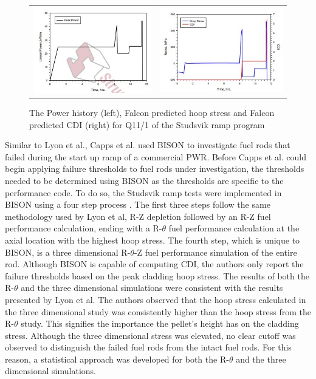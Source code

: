 \documentclass[edeposit,fullpage,11pt]{uiucthesis2009}
\begin{document}
\begin{figure}
\begin{tabular}{cc}
\includegraphics[width=0.5\linewidth]{./Figures/lyon_image_6.JPG} & \includegraphics[width=0.5\linewidth]{./Figures/lyon_image_7.JPG}
\end{tabular}
\caption{The Power history (left), Falcon predicted hoop stress and Falcon predicted CDI (right) for Q11/1 of the Studsvik ramp program \cite{lyon_pci_2009}}
\label{fig:paper_3_res}
\end{figure}


Similar to Lyon et al., Capps et al. \cite{capps_pci_2017} used BISON to investigate fuel rods that failed during the start up ramp of a commercial \gls{PWR}.
Before Capps et al. could begin applying failure thresholds to fuel rods under investigation, the thresholds needed to be determined using BISON as the thresholds are specific to the performance code.
To do so, the Studsvik ramp tests were implemented in BISON using a four step process \cite{killeen_experimental_2004}.
The first three steps follow the same methodology used by Lyon et al, R-Z depletion followed by an R-Z fuel performance calculation, ending with a R-$\theta$ fuel performance calculation at the axial location with the highest hoop stress.
The fourth step, which is unique to BISON, is a three dimensional R-$\theta$-Z fuel performance simulation of the entire rod. %
Although BISON is capable of computing \gls{CDI}, the authors only report the failure thresholds based on the peak cladding hoop stress.
The results of both the R-$\theta$ and the three dimensional simulations were consistent with the results presented by Lyon et al.
The authors observed that the hoop stress calculated in the three dimensional study was consistently higher than the hoop stress from the R-$\theta$ study.
This signifies the importance the pellet's height has on the cladding stress.
Although the three dimensional stress was elevated, no clear cutoff was observed to distinguish the failed fuel rods from the intact fuel rods.
For this reason, a statistical approach was developed for both the R-$\theta$ and the three dimensional simulations.
\end{document}
